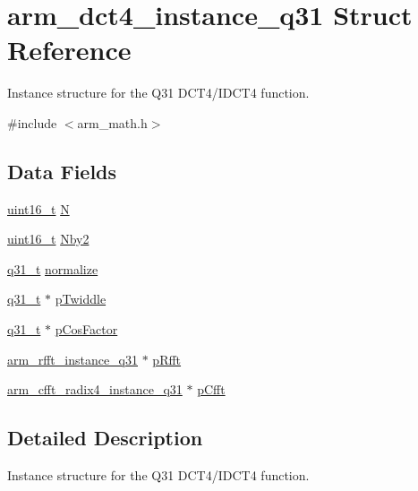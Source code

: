 \hypertarget{structarm__dct4__instance__q31}{\section{arm\-\_\-dct4\-\_\-instance\-\_\-q31 Struct Reference}
\label{structarm__dct4__instance__q31}
}


Instance structure for the Q31 D\-C\-T4/\-I\-D\-C\-T4 function.  




{\ttfamily \#include $<$arm\-\_\-math.\-h$>$}

\subsection*{Data Fields}
\begin{DoxyCompactItemize}
\item 
\hyperlink{stdint_8h_a273cf69d639a59973b6019625df33e30}{uint16\-\_\-t} \hyperlink{structarm__dct4__instance__q31_a46a9f136457350676e2bfd3768ff9d6d}{N}
\item 
\hyperlink{stdint_8h_a273cf69d639a59973b6019625df33e30}{uint16\-\_\-t} \hyperlink{structarm__dct4__instance__q31_a32d3268ba4629908dba056599f0a904d}{Nby2}
\item 
\hyperlink{arm__math_8h_adc89a3547f5324b7b3b95adec3806bc0}{q31\-\_\-t} \hyperlink{structarm__dct4__instance__q31_ac80ff7b28fca36aeef74dea12e8312dd}{normalize}
\item 
\hyperlink{arm__math_8h_adc89a3547f5324b7b3b95adec3806bc0}{q31\-\_\-t} $\ast$ \hyperlink{structarm__dct4__instance__q31_a7db236e22673146bb1d2c962f0713f08}{p\-Twiddle}
\item 
\hyperlink{arm__math_8h_adc89a3547f5324b7b3b95adec3806bc0}{q31\-\_\-t} $\ast$ \hyperlink{structarm__dct4__instance__q31_af97204d1838925621fc82021a0c2d6c1}{p\-Cos\-Factor}
\item 
\hyperlink{structarm__rfft__instance__q31}{arm\-\_\-rfft\-\_\-instance\-\_\-q31} $\ast$ \hyperlink{structarm__dct4__instance__q31_af1487dab5e7963b85dc0fdc6bf492542}{p\-Rfft}
\item 
\hyperlink{structarm__cfft__radix4__instance__q31}{arm\-\_\-cfft\-\_\-radix4\-\_\-instance\-\_\-q31} $\ast$ \hyperlink{structarm__dct4__instance__q31_ac96579cfb28d08bb11dd2fe4c6303833}{p\-Cfft}
\end{DoxyCompactItemize}


\subsection{Detailed Description}
Instance structure for the Q31 D\-C\-T4/\-I\-D\-C\-T4 function. 

